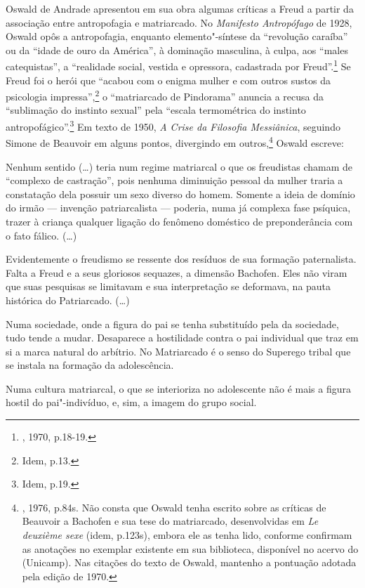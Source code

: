 Oswald de Andrade apresentou em sua obra algumas críticas a Freud a
partir da associação entre antropofagia e matriarcado. No
\emph{Manifesto Antropófago} de 1928, Oswald opôs a antropofagia,
enquanto elemento"-síntese da ``revolução caraíba'' ou da ``idade de ouro
da América'', à dominação masculina, à culpa, aos ``males catequistas'',
a ``realidade social, vestida e opressora, cadastrada por
Freud''.\footnote{, 1970, p.18-19.} Se Freud foi o herói que
``acabou com o enigma mulher e com outros sustos da psicologia
impressa'',\footnote{Idem, p.13.} o ``matriarcado de Pindorama'' anuncia
a recusa da ``sublimação do instinto sexual'' pela ``escala termométrica
do instinto antropofágico''.\footnote{Idem, p.19.} Em texto de 1950,
\emph{A Crise da Filosofia Messiânica}, seguindo Simone de Beauvoir em
alguns pontos, divergindo em outros,\footnote{, 1976, p.84s.
  Não consta que Oswald tenha escrito sobre as críticas de Beauvoir a
  Bachofen e sua tese do matriarcado, desenvolvidas em \emph{Le deuxième
  sexe} (idem, p.123s), embora ele as tenha lido, conforme confirmam as
  anotações no exemplar existente em sua biblioteca, disponível no
  acervo do  (Unicamp). Nas citações do texto de Oswald, mantenho a
  pontuação adotada pela edição de 1970.} Oswald escreve:

Nenhum sentido (\ldots{}) teria num regime matriarcal o que os freudistas
chamam de ``complexo de castração'', pois nenhuma diminuição pessoal da
mulher traria a constatação dela possuir um sexo diverso do homem.
Somente a ideia de domínio do irmão --- invenção patriarcalista ---
poderia, numa já complexa fase psíquica, trazer à criança qualquer
ligação do fenômeno doméstico de preponderância com o fato fálico. (\ldots{})

Evidentemente o freudismo se ressente dos resíduos de sua formação
paternalista. Falta a Freud e a seus gloriosos sequazes, a dimensão
Bachofen. Eles não viram que suas pesquisas se limitavam e sua
interpretação se deformava, na pauta histórica do Patriarcado. (\ldots{})

Numa sociedade, onde a figura do pai se tenha substituído pela da
sociedade, tudo tende a mudar. Desaparece a hostilidade contra o pai
individual que traz em si a marca natural do arbítrio. No Matriarcado é
o senso do Superego tribal que se instala na formação da adolescência.

Numa cultura matriarcal, o que se interioriza no adolescente não é mais
a figura hostil do pai"-indivíduo, e, sim, a imagem do grupo social.

